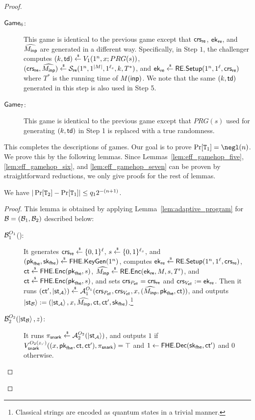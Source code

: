 \begin{proof}
\begin{description}
\item[$\game_6$:]
This game is identical to the previous game except that $\crs_\re$, $\ek_\re$, and $\Menc$ are generated in a different way. Specifically, in Step $1$, the challenger computes
$(k,\td)\sample \ver_1(1^\secpar,x;PRG(s))$, $(\crs_\re,\Menc)\sample \calS_\re(1^\secpar,1^{|M|},1^{\ell_s},k,T^*)$, and $\ek_\re \sample \rsetup(1^\secpar,1^\ell,\crs_\re)$ where $T^*$ is the running time of $M(\inp)$.
We note that the same $(k,\td)$ generated in this step is also used in Step 5.

\item[$\game_7$:]
This game is identical to the previous game except that $PRG(s)$ used for generating $(k,\td)$ in Step 1 is replaced with a true randomness.
\end{description}

This completes the descriptions of games. 
Our goal is to prove $\Pr[\TT_1]=\negl(\secpar)$. We prove this by the following lemmas. 
Since Lemmas~\ref{lem:eff_gamehop_five}, \ref{lem:eff_gamehop_six}, and \ref{lem:eff_gamehop_seven} can be proven by straightforward reductions, we only give proofs for the rest of lemmas.



\begin{lemma}\label{lem:eff_gamehop_one}
We have $|\Pr[\TT_2]-\Pr[\TT_1]|\leq q_12^{-(\secpar+1)}$.
\end{lemma}
\begin{proof}
This lemma is obtained by applying Lemma~\ref{lem:adaptive_program} for $\B=(\B_1,\B_2)$ described below:
\begin{description}
\item[$\B_1^{O_1}$():]   It generates 
    $\crs_\re\sample \bit^{\ell}$,  $s\sample \bit^{\ell_s}$, and $(\pk_{\fhe},\sk_{\fhe})\sample \fhekeygen(1^\secpar)$, computes $\ek_\re\sample \rsetup(1^\secpar,1^\ell,\crs_\re)$,  $\ct\sample \fheenc(\pk_{\fhe},s)$, $\Menc\sample \renc(\ek_\re,M,s,T')$,  and $\ct\sample \fheenc(\pk_{\fhe},s)$, and sets $\crs_{\proeff}=\crs_\re$ and $\crs_{\vereff}\defeq \ek_\re$.
Then it runs $(\ct',\ket{\st_{\A}})\sample \A_1^{O_1}(\crs_{\proeff},\crs_{\vereff},x,(\Menc,\pk_{\fhe},\ct))$, and outputs $\ket{\st_\B}\defeq(\ket{\st_\A},x,\Menc,\ct,\ct',\sk_\fhe)$.\footnote{Classical strings are encoded as quantum states in a trivial manner.}
\item[$\B_2^{O_2}(\ket{\st_\B},z)$:] 
It runs $\pi_{\snark}\sample \A_2^{O_2}(\ket{\st_\A})$, and outputs $1$ if $\ver_{\snark}^{O_2(z,\cdot)}((x,\pk_{\fhe},\ct,\ct'),\pi_{\snark})=\top$ and $1 \la \fhedec(\sk_{\fhe},\ct')$ and $0$ otherwise.
\end{description}
\end{proof}


\end{proof}
